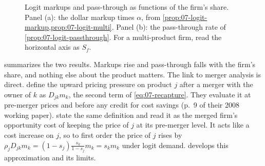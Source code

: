 \begin{figure}[htbp]
\centering
{}
\caption{Logit markups and pass-through as functions of the firm's share. Panel (a): the dollar markup times $\alpha$,
from \cref{prop:07-logit-markup,prop:07-logit-multi}. Panel (b): the pass-through rate of
\cref{prop:07-logit-passthrough}. For a multi-product firm, read the horizontal axis as $S_f$.}
\label{fig:07-markups}
\end{figure}

 summarizes the two results. Markups rise and pass-through falls with the firm's share, and
nothing else about the product matters. The link to merger analysis is direct. \citet{FarrellShapiro2010} define the
upward pricing pressure on product $j$ after a merger with the owner of $k$ as $D_{jk}m_k$, the second term of
\eqref{eq:07-recapture}. They evaluate it at pre-merger prices and before any credit for cost savings (p.~9 of their
2008 working paper). \citet[p.~231]{AskerNocke2021} state the same definition and read it as the merged firm's
opportunity cost of keeping the price of $j$ at its pre-merger level. It acts like a cost increase on $j$, so to first
order the price of $j$ rises by
$\rho_j D_{jk}m_k = (1 - s_j)\frac{s_k}{1 - s_j}m_k = s_k m_k$ under logit demand.  develops this
approximation and its limits.

